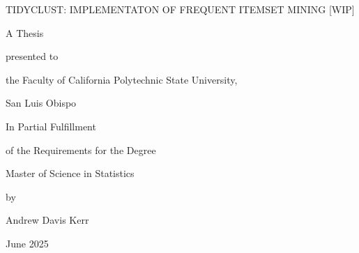 \begin{center}
\thispagestyle{empty}

TIDYCLUST: IMPLEMENTATON OF FREQUENT ITEMSET MINING [WIP]

\vspace{1in}

A Thesis 

presented to 

the Faculty of California Polytechnic State University, 

San Luis Obispo

\vspace{1in}

In Partial Fulfillment 

of the Requirements for the Degree

Master of Science in Statistics 

\vspace{1in}

by

Andrew Davis Kerr

June 2025

\end{center}
\clearpage